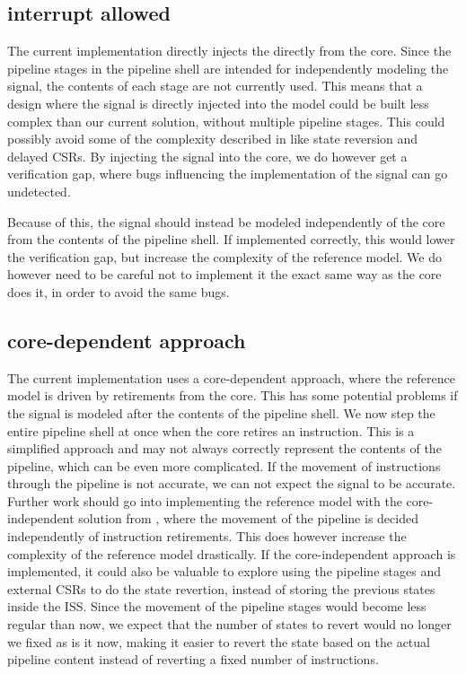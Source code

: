 \subsection{interrupt allowed}

The current implementation directly injects the  directly from the core. Since the pipeline stages in the pipeline shell are intended for independently modeling the  signal, the contents of each stage are not currently used. This means that a design where the  signal is directly injected into the model could be built less complex than our current solution, without multiple pipeline stages. This could possibly avoid some of the complexity described in  like state reversion and delayed CSRs. By injecting the  signal into the core, we do however get a verification gap, where bugs influencing the implementation of the  signal can go undetected.

Because of this, the  signal should instead be modeled independently of the core from the contents of the pipeline shell. If implemented correctly, this would lower the verification gap, but increase the complexity of the reference model. We do however need to be careful not to implement it the exact same way as the core does it, in order to avoid the same bugs.

\subsection{core-dependent approach}

The current implementation uses a core-dependent approach, where the reference model is driven by retirements from the core. This has some potential problems if the  signal is modeled after the contents of the pipeline shell. We now step the entire pipeline shell at once when the core retires an instruction. This is a simplified approach and may not always correctly represent the contents of the pipeline, which can be even more complicated. If the movement of instructions through the pipeline is not accurate, we can not expect the  signal to be accurate. Further work should go into implementing the reference model with the core-independent solution from , where the movement of the pipeline is decided independently of instruction retirements. This does however increase the complexity of the reference model drastically. If the core-independent approach is implemented, it could also be valuable to explore using the pipeline stages and external CSRs to do the state revertion, instead of storing the previous states inside the ISS. Since the movement of the pipeline stages would become less regular than now, we expect that the number of states to revert would no longer we fixed as is it now, making it easier to revert the state based on the actual pipeline content instead of reverting a fixed number of instructions. 

